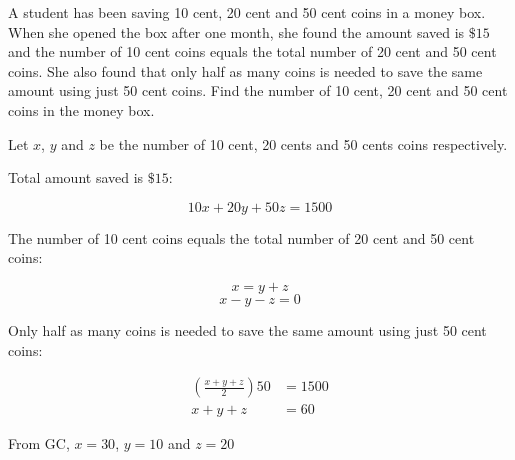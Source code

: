 \documentclass[11pt,a4paper]{book}
\begin{document}
\begin{example}

A student has been saving 10 cent, 20 cent and 50 cent coins in a
money box. When she opened the box after one month, she found the amount
saved is $\$15$ and the number of 10 cent coins equals the total
number of 20 cent and 50 cent coins. She also found that only half
as many coins is needed to save the same amount using just 50 cent
coins. Find the number of 10 cent, 20 cent and 50 cent coins in the
money box.

\Solution

Let $x$, $y$ and $z$ be the number of 10 cent, 20 cents and 50
cents coins respectively.

Total amount saved is $\$15$:

\[
10x+20y+50z=1500\tag{1}
\]

The number of 10 cent coins equals the total number of 20 cent and
50 cent coins:

\[
x=y+z
\]
\[
x-y-z=0\tag{2}
\]

Only half as many coins is needed to save the same amount using just
50 cent coins:

\begin{align*}
\left(\frac{x+y+z}{2}\right)50 & =1500\\
x+y+z & =60\tag{3}
\end{align*}

From GC, $x=30$, $y=10$ and $z=20$
\end{example}

\newpage
\end{document}
